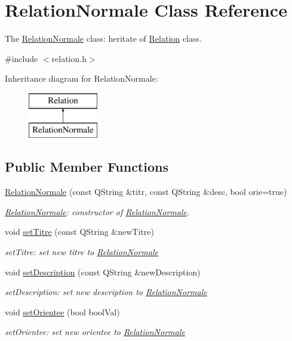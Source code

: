 \hypertarget{class_relation_normale}{}\section{Relation\+Normale Class Reference}
\label{class_relation_normale}


The \hyperlink{class_relation_normale}{Relation\+Normale} class\+: heritate of \hyperlink{class_relation}{Relation} class.  




{\ttfamily \#include $<$relation.\+h$>$}

Inheritance diagram for Relation\+Normale\+:\begin{figure}[H]
\begin{center}
\leavevmode
\includegraphics[height=2.000000cm]{class_relation_normale}
\end{center}
\end{figure}
\subsection*{Public Member Functions}
\begin{DoxyCompactItemize}
\item 
\hyperlink{class_relation_normale_a72d6b0c9f9e59ee634542aee57f2a9fb}{Relation\+Normale} (const Q\+String \&titr, const Q\+String \&desc, bool orie=true)
\begin{DoxyCompactList}\small\item\em \hyperlink{class_relation_normale}{Relation\+Normale}\+: constructor of \hyperlink{class_relation_normale}{Relation\+Normale}. \end{DoxyCompactList}\item 
void \hyperlink{class_relation_normale_abd0076a23f702ced9af181a0f046652c}{set\+Titre} (const Q\+String \&new\+Titre)
\begin{DoxyCompactList}\small\item\em set\+Titre\+: set new titre to \hyperlink{class_relation_normale}{Relation\+Normale} \end{DoxyCompactList}\item 
void \hyperlink{class_relation_normale_a74c586177c06279726df02dd1d8b721a}{set\+Description} (const Q\+String \&new\+Description)
\begin{DoxyCompactList}\small\item\em set\+Description\+: set new description to \hyperlink{class_relation_normale}{Relation\+Normale} \end{DoxyCompactList}\item 
void \hyperlink{class_relation_normale_a6095c88468d08fbe6c3d35fa5aedc635}{set\+Orientee} (bool bool\+Val)
\begin{DoxyCompactList}\small\item\em set\+Orientee\+: set new orientee to \hyperlink{class_relation_normale}{Relation\+Normale} \end{DoxyCompactList}\end{DoxyCompactItemize}
